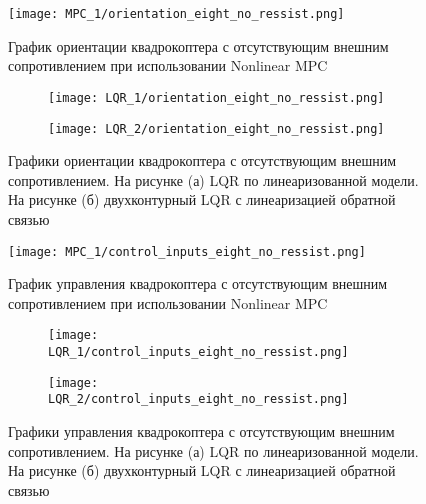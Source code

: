 \newpage

\begin{figure}[ht]
    \centering
    \texttt{[image: MPC\_1/orientation\_eight\_no\_ressist.png]}
    \caption{График ориентации квадрокоптера с отсутствующим внешним сопротивлением при использовании Nonlinear MPC}
    \label{}
\end{figure}

\begin{figure}[ht]
	\centering
\hspace*{\fill}%
	\begin{subfigure}[b]{0.49\textwidth}
        \centering
		\texttt{[image: LQR\_1/orientation\_eight\_no\_ressist.png]}
		\caption{}
		\label{fig:tiger1}
	\end{subfigure}
\hfill
	\begin{subfigure}[b]{0.49\textwidth}
        \centering
		\texttt{[image: LQR\_2/orientation\_eight\_no\_ressist.png]}
        \caption{}
		\label{fig:tiger2}
	\end{subfigure}
\hspace*{\fill}%
	\caption{Графики ориентации квадрокоптера с отсутствующим внешним сопротивлением. На рисунке (а) LQR по линеаризованной модели. На рисунке (б) двухконтурный LQR с линеаризацией обратной связью}
	\label{fig:tiger}
\end{figure}

\newpage

\begin{figure}[ht]
    \centering
    \texttt{[image: MPC\_1/control\_inputs\_eight\_no\_ressist.png]}
    \caption{График управления квадрокоптера с отсутствующим внешним сопротивлением при использовании Nonlinear MPC}
    \label{}
\end{figure}

\begin{figure}[ht]
	\centering
\hspace*{\fill}%
	\begin{subfigure}[b]{0.49\textwidth}
        \centering
		\texttt{[image: LQR\_1/control\_inputs\_eight\_no\_ressist.png]}
		\caption{}
		\label{fig:tiger1}
	\end{subfigure}
\hfill
	\begin{subfigure}[b]{0.49\textwidth}
        \centering
		\texttt{[image: LQR\_2/control\_inputs\_eight\_no\_ressist.png]}
        \caption{}
		\label{fig:tiger2}
	\end{subfigure}
\hspace*{\fill}%
	\caption{Графики управления квадрокоптера с отсутствующим внешним сопротивлением. На рисунке (а) LQR по линеаризованной модели. На рисунке (б) двухконтурный LQR с линеаризацией обратной связью}
	\label{fig:tiger}
\end{figure}

